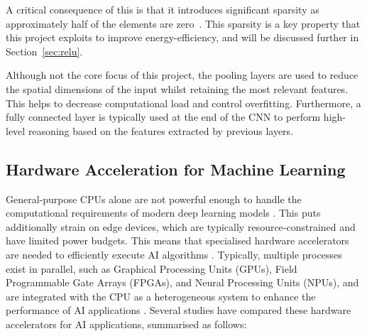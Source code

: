 \documentclass[12pt, a4paper, ukenglish]{article}
\begin{document}
    A critical consequence of this is that it introduces significant sparsity as approximately half of the elements are zero~\cite{sun_sense_2023}. This sparsity is a key property that this project exploits to improve energy-efficiency, and will be discussed further in Section~\ref{sec:relu}.

    Although not the core focus of this project, the pooling layers are used to reduce the spatial dimensions of the input whilst retaining the most relevant features. This helps to decrease computational load and control overfitting. Furthermore, a fully connected layer is typically used at the end of the CNN to perform high-level reasoning based on the features extracted by previous layers\cite{cain_convolution_2021}.




    \subsection{Hardware Acceleration for Machine Learning} \label{sec: hardware accel}
    General-purpose CPUs alone are not powerful enough to handle the computational requirements of modern deep learning models \cite{zhang_energy-efficient_2022}. This puts additionally strain on edge devices, which are typically resource-constrained and have limited power budgets. This means that specialised hardware accelerators are needed to efficiently execute AI algorithms \cite{manor_custom_2022}. Typically, multiple processes exist in parallel, such as Graphical Processing Units (GPUs), Field Programmable Gate Arrays (FPGAs), and Neural Processing Units (NPUs), and are integrated with the CPU as a heterogeneous system  to enhance the performance of AI applications \cite{manor_custom_2022}. Several studies have compared these hardware accelerators for AI applications, summarised as follows:
\end{document}
